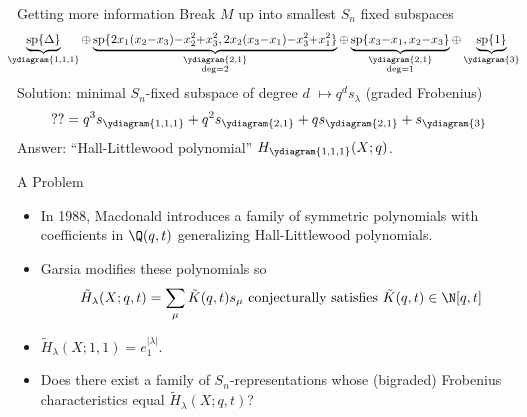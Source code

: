 \documentclass{beamer}
\renewcommand{\Span}{\operatorname{sp}}
\newcounter{c}
\begin{document}
\begin{frame}{Getting more information}
  \pause
  Break \(M\) up into smallest \(S_n\) fixed subspaces 
  \[
    \hspace{-0.75em}
    \scalebox{0.95}{\(
      \underbrace{\Span\{\Delta\}}_{\ydiagram{1,1,1}} {\oplus} \underbrace{\Span\{2x_1(x_2{-}x_3){-}x_2^2{+}x_3^2,
        2x_2(x_3{-}x_1){-}x_3^2{+}x_1^2\}}_{\substack{\ydiagram{2,1}\\\deg
        = 2}} {\oplus}
      \underbrace{\Span\{x_3{-}x_1, x_2{-}x_3\}}_{\substack{\ydiagram{2,1}\\\deg=1}} {\oplus} \underbrace{\Span\{1\}}_{\ydiagram{3}}\)}
  \]
  \pause
  Solution: minimal \(S_n\)-fixed subspace of degree \(d\) \(\mapsto q^d
  s_\lambda\) (graded Frobenius)\[
    ?? = q^3 s_{\ydiagram{1,1,1}} + q^2 s_{\ydiagram{2,1}} + q
    s_{\ydiagram{2,1}} + s_{\ydiagram{3}}
  \]\pause
  Answer: ``Hall-Littlewood polynomial'' \(H_{\ydiagram{1,1,1}}(X;q)\).
\end{frame}
\begin{frame}{A Problem}
  \begin{itemize}
  \item In 1988, Macdonald introduces a family of symmetric
    polynomials with coefficients in \(\Q(q,t)\) generalizing
    Hall-Littlewood polynomials.\pause
  \item Garsia modifies these polynomials so 
    \[
      \tilde{H}_\lambda(X;q,t) = \sum_\mu \tilde{K}(q,t) s_\mu \text{
        conjecturally satisfies }\tilde{K}(q,t) \in \N[q,t]
    \]\pause
  \item \(\tilde{H}_\lambda(X;1,1) = e_1^{|\lambda|}\).\pause
  \item Does there
    exist a family of \(S_n\)-representations whose (bigraded)
    Frobenius characteristics equal \(\tilde{H}_\lambda(X;q,t)\)?
  \end{itemize}
\end{frame}
\end{document}
